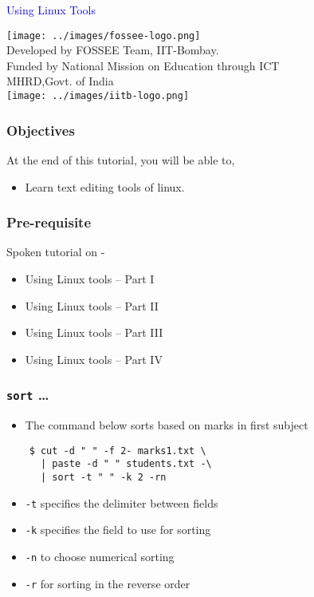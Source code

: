 \documentclass[12pt,compress]{beamer}
\begin{document}
\begin{frame}

\begin{center}
\vspace{12pt}
\textcolor{blue}{\huge Using Linux Tools}
\end{center}
\vspace{18pt}
\begin{center}
\vspace{10pt}
\texttt{[image: ../images/fossee-logo.png]}\\
\vspace{5pt}
\scriptsize Developed by FOSSEE Team, IIT-Bombay. \\ 
\scriptsize Funded by National Mission on Education through ICT\\
\scriptsize  MHRD,Govt. of India\\
\texttt{[image: ../images/iitb-logo.png]}\\
\end{center}
\end{frame}
\begin{frame}
\frametitle{Objectives}
\label{sec-2}

At the end of this tutorial, you will be able to,
\begin{itemize}
\item Learn text editing tools of linux.
\end{itemize}
\end{frame}

\begin{frame}
\frametitle{Pre-requisite}
\label{sec-3}

Spoken tutorial on -
\begin{itemize}
\item Using Linux tools -- Part I
\item Using Linux tools -- Part II
\item Using Linux tools -- Part III
\item Using Linux tools -- Part IV
\end{itemize}
\end{frame}

\begin{frame}[fragile]
  \frametitle{\texttt{sort} \ldots}
  \begin{itemize}
  \item The command below sorts based on marks in first subject
  \end{itemize}
  \begin{lstlisting}
    $ cut -d " " -f 2- marks1.txt \
      | paste -d " " students.txt -\
      | sort -t " " -k 2 -rn
  \end{lstlisting} %
  \begin{itemize}
  \item \texttt{-t} specifies the delimiter between fields
  \item \texttt{-k} specifies the field to use for sorting
  \item \texttt{-n} to choose numerical sorting
  \item \texttt{-r} for sorting in the reverse order
  \end{itemize}
\end{frame}
\end{document}
